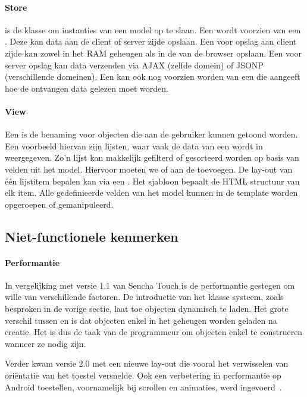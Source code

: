 \paragraph{Store}
 is de klasse om instanties van een model op te slaan.  Een  wordt voorzien van een .  Deze kan data aan de client of server zijde opslaan.  Een  voor opslag aan client zijde kan zowel in het RAM geheugen als in de  van de browser opslaan.  Een  voor server opslag kan data verzenden via AJAX (zelfde domein) of JSONP (verschillende domeinen).  Een  kan ook nog voorzien worden van een  die aangeeft hoe de ontvangen data gelezen moet worden.

\paragraph{View}
Een  is de benaming voor objecten die aan de gebruiker kunnen getoond worden.  Een voorbeeld hiervan zijn lijsten,  waar vaak de data van een  wordt in weergegeven.  Zo'n lijst kan makkelijk gefilterd of gesorteerd worden op basis van velden uit het model.  Hiervoor moeten we  of  aan de  toevoegen.  De lay-out van één lijstitem bepalen kan via een .  Het sjabloon bepaalt de HTML structuur van elk item.  Alle gedefinieerde velden van het model kunnen in de template worden opgeroepen of gemanipuleerd.

\subsection{Niet-functionele kenmerken}
\paragraph{Performantie}
In vergelijking met versie 1.1 van Sencha Touch is de performantie gestegen om wille van verschillende factoren.  De introductie van het klasse systeem,  zoals besproken in de vorige sectie,  laat toe objecten dynamisch te laden.  Het grote verschil tussen  en  is dat objecten enkel in het geheugen worden geladen na creatie.  Het is dus de taak van de programmeur om objecten enkel te construeren wanneer ze nodig zijn.

Verder kwam versie 2.0 met een nieuwe lay-out  die vooral het verwisselen van oriëntatie van het toestel versnelde.  Ook een verbetering in performantie op Android toestellen,  voornamelijk bij scrollen en animaties,  werd ingevoerd~\cite{Inc.}.

